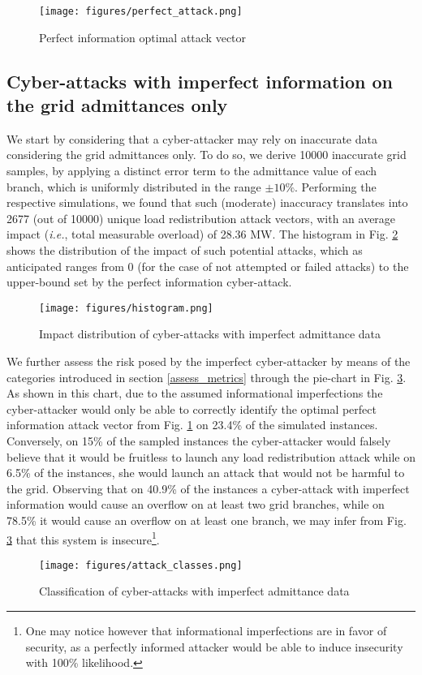 \documentclass{IEEEtran4PSCC}
\begin{document}
\begin{figure}[h]
\centering
\texttt{[image: figures/perfect\_attack.png]}
\caption{Perfect information optimal attack vector}
\label{fig:perfect}
\end{figure}

\subsection{Cyber-attacks with imperfect information on the grid admittances  {only}}

We start by considering that a cyber-attacker may rely on inaccurate data considering the grid admittances only. To do so, we derive 10000 inaccurate grid samples, by applying a distinct error term to the admittance value of each branch, which is uniformly distributed in the range $\pm10\%$. Performing the respective simulations, we found that such (moderate) inaccuracy translates into 2677 (out of 10000) unique load redistribution attack vectors, with an average impact  {(\textit{i.e.}, total measurable overload)} of 28.36 MW. The histogram in Fig. \ref{fig:hist} shows the distribution of the impact of such potential attacks, which as anticipated ranges from 0 (for the case of not attempted or failed attacks) to the upper-bound set by the perfect information cyber-attack.
\begin{figure}[h]
\centering
\texttt{[image: figures/histogram.png]}
\caption{Impact distribution of cyber-attacks with imperfect admittance data}
\label{fig:hist}
\end{figure}

We further assess the risk posed by the imperfect cyber-attacker by means of the categories introduced in section \ref{assess_metrics} through the pie-chart in Fig. \ref{fig:classes}. As shown in this chart, due to the assumed informational imperfections the cyber-attacker would only be able to correctly identify the optimal perfect information attack vector from Fig. \ref{fig:perfect} on 23.4\% of the simulated instances. Conversely, on 15\% of the sampled instances the cyber-attacker would falsely believe that it would be fruitless to launch any load redistribution attack while on 6.5\% of the instances, she would launch an attack that would not be harmful to the grid.  Observing that on 40.9\% of the instances a cyber-attack with imperfect information would cause an overflow on at least two grid branches, while on 78.5\% it would cause an overflow on at least one branch, we may infer from Fig. \ref{fig:classes}
that this system is insecure\footnote{One may notice however that informational imperfections are in favor of security, as a perfectly informed attacker would be able to induce insecurity with 100\% likelihood.}. 
\begin{figure}[h]
\centering
\texttt{[image: figures/attack\_classes.png]}
\caption{Classification of cyber-attacks with imperfect admittance data}
\label{fig:classes}
\end{figure}
\end{document}
